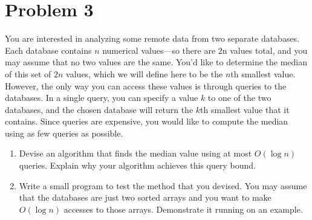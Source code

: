 \section{Problem 3}

You are interested in analyzing some remote data from two separate databases. 
Each database contains $n$ numerical values—so there are $2$n values total, and you may assume that no two values are the same. 
You'd like to determine the median of this set of $2n$ values, which we will define here to be the $n$th smallest value.
However, the only way you can access these values is through queries to the databases. 
In a single query, you can specify a value $k$ to one of the two databases, 
and the chosen database will return the $k$th smallest value that it contains. 
Since queries are expensive, you would like to compute the median using as few queries as possible.

\begin{enumerate}
\item Devise an algorithm that finds the median value using at most $O(\log n)$ queries. 
    Explain why your algorithm achieves this query bound.
\item Write a small program to test the method that you devised. 
    You may assume that the databases are just two sorted arrays and you want to make $O(\log n)$ accesses to those arrays. 
    Demonstrate it running on an example.
\end{enumerate}


